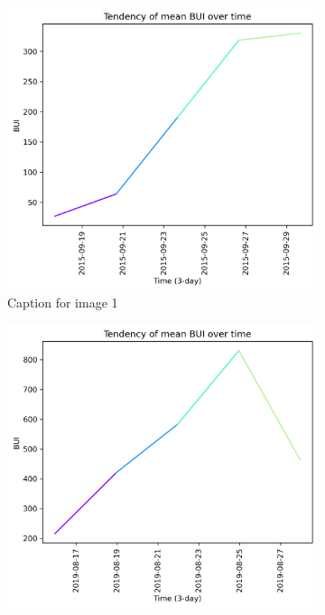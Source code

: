 \begin{figure}[h]
    \centering
    \caption{Caption for the whole figure}
    \begin{subfigure}{0.3\textwidth}
        \centering
        \includegraphics[width=\textwidth]{graphs/2015/15daysprior/2015_15daysprior_tendency_graph_BUI.png}
        \caption{Caption for image 1}
        \label{fig:img1}
    \end{subfigure}
    \hfill
    \begin{subfigure}{0.3\textwidth}
        \centering
        \includegraphics[width=\textwidth]{graphs/2019/15daysprior/2019_15daysprior_tendency_graph_BUI.png}

\end{subfigure}
\end{figure}

